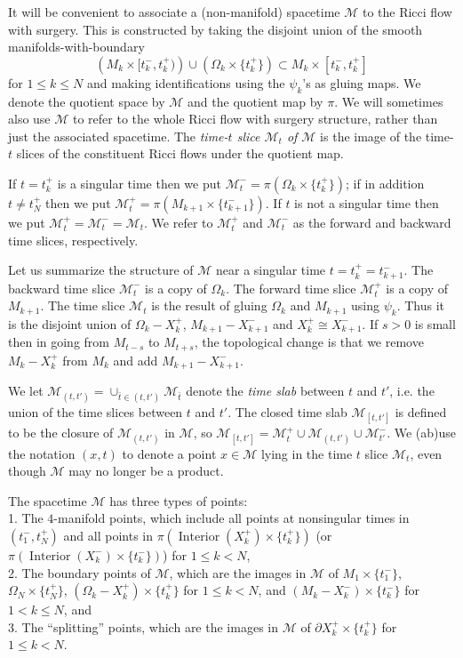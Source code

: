 \documentclass[12pt]{amsart}
\newcommand{\D}{\partial}
\newcommand{\interior}{\operatorname{Interior}}
\newcommand{\M}{{\mathcal M}}
\newcommand{\Om}{\Omega}
\numberwithin{equation}{section}
\theoremstyle{plain}
\theoremstyle{definition}
\theoremstyle{remark}
\begin{document}
It will be convenient to associate a (non-manifold) spacetime $\M$ to
the Ricci flow with surgery.  This is constructed by taking the disjoint union 
of  the smooth manifolds-with-boundary  
\begin{equation}
\left(M_k\times [t_k^-,t_k^+)\right)\cup \left(\Om_k\times\{t_k^+\}\right)
\subset M_k\times [t_k^-,t_k^+]
\end{equation}
 for $1\leq k\leq N$
and making identifications using the $\psi_k$'s as gluing
maps.   We denote the quotient space by $\M$ and the quotient map
by $\pi$.  We will sometimes also use $\M$ to refer to the
whole Ricci flow with surgery structure,
rather than just the associated spacetime.
The {\em time-$t$ slice $\M_t$ of $\M$} is the image 
of the time-$t$ slices of the constituent Ricci
flows under the quotient map.  
 
If $t=t_k^+$ is a singular time then we put 
$\M_t^-=\pi(\Omega_k\times\{t_k^+\})$;  if in addition $t\neq t_N^+$ then 
we put $\M_t^+=\pi(M_{k+1}\times\{t_{k+1}^-\})$. If $t$ is not a singular time
then we put  $\M_t^+=\M_t^-=\M_t$. We refer to 
$\M_t^+$ and $\M_t^-$ as the forward and backward time
slices, respectively.

Let us summarize the structure of $\M$ near a singular time $t = t_k^+ = t_{k+1}^-$.
The backward time slice $\M_t^-$ is a copy of $\Omega_k$. The forward
time slice $\M_t^+$ is a copy of $M_{k+1}$. The time slice
$\M_t$ is the result of gluing $\Omega_k$ and $M_{k+1}$ using $\psi_k$.
Thus it is the disjoint union of $\Omega_k - X_k^+$, $M_{k+1} - X_{k+1}^-$ and
$X_k^+ \cong X_{k+1}^-$.  If $s > 0$ is small then in going from $M_{t-s}$ to
$M_{t+s}$, the topological change is that we remove
$M_k - X_k^+$ from $M_k$ and add $M_{k+1} - X_{k+1}^-$.

We let $\M_{(t,t')} = \cup_{\bar t\in(t,t')} \M_{\bar t}$ denote
the  {\em time slab} between $t$ and $t'$, i.e. 
the union of the time slices between $t$ and $t'$.
The closed time
slab $\M_{[t,t']}$ is defined to be the closure of $\M_{(t,t')}$
in $\M$, so $\M_{[t,t']}=\M_t^+\cup\M_{(t,t')}\cup \M_{t'}^-$.
We  (ab)use  the notation
$(x,t)$ to denote a point $x\in\M$ lying in the time $t$ slice $\M_t$, 
even though
$\M$ may no longer be a product.

The spacetime $\M$
has three types of points:  \\
1. The  $4$-manifold
points, which include all points at 
nonsingular times in
$(t^-_1, t^+_N)$ and all
points in $\pi(\interior(X_k^+)\times \{t_k^+\})$ 
(or $\pi(\interior(X_{k}^-)\times \{t_{k}^-\})$) for $1 \le k < N$,
\\
2. The boundary points of $\M$, which are the images in $\M$ of
$M_1\times \{t_1^-\}$,
$\Omega_N \times \{t^+_N\}$,
$(\Om_k - X_k^+)\times \{t_k^+\}$ for 
$1\leq k<N$, and $(M_k - X_k^-)\times \{t_k^-\}$ for $1<k\leq N$, and \\
3. The ``splitting'' points, which
 are the images in $\M$ of $\D X_k^+\times\{t_k^+\}$
for $1\leq k<N$.  
\end{document}

